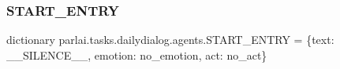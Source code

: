 \subsubsection{\texorpdfstring{S\+T\+A\+R\+T\+\_\+\+E\+N\+T\+RY}{START\_ENTRY}}
{\footnotesize\ttfamily dictionary parlai.\+tasks.\+dailydialog.\+agents.\+S\+T\+A\+R\+T\+\_\+\+E\+N\+T\+RY = \{\textquotesingle{}text\textquotesingle{}\+: \textquotesingle{}\+\_\+\+\_\+\+S\+I\+L\+E\+N\+C\+E\+\_\+\+\_\+\textquotesingle{}, \textquotesingle{}emotion\textquotesingle{}\+: \textquotesingle{}no\+\_\+emotion\textquotesingle{}, \textquotesingle{}act\textquotesingle{}\+: \textquotesingle{}no\+\_\+act\textquotesingle{}\}}

